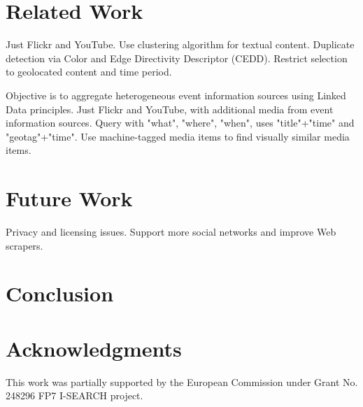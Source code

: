 \documentclass{acm_proc_article-sp}
\newcommand{\inlinelistingsize}{\fontsize{8pt}{11pt}}
\let\oldttdefault\ttdefault
\renewcommand{\ttdefault}{pcr}
\let\oldurl\url
\renewcommand{\url}[1]{\inlinelistingsize\oldurl{#1}}
\begin{document}
\section{Related Work} \label{sec:relatedwork}
\cite{Fabro2012}
Just Flickr and YouTube.
Use clustering algorithm for textual content.
Duplicate detection via Color and Edge Directivity Descriptor (CEDD).
Restrict selection to geolocated content and time period.

\cite{Liu2011}
Objective is to aggregate heterogeneous event information sources using Linked Data principles.
Just Flickr and YouTube, with additional media from event information sources.
Query with "what", "where", "when", uses "title"+"time" and "geotag"+"time".
Use machine-tagged media items to find visually similar media items.

\section{Future Work}
Privacy and licensing issues.
Support more social networks and improve Web scrapers.

\section{Conclusion}

\section{Acknowledgments}
This work was partially supported by the European Commission under Grant No. 248296 FP7 \mbox{I-SEARCH} project.

\let\ttdefault\oldttdefault
\let\url\oldurl




\balancecolumns
\end{document}
